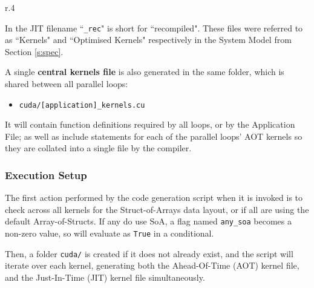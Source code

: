 \begin{wrapfigure}[5]{r}{.4\textwidth}
  \vspace{-1cm}
\end{wrapfigure}
\noindent In the JIT filename ``\verb|_rec|" is short for ``recompiled". These files were referred to as ``Kernels" and ``Optimised Kernels" respectively in the System Model from Section \ref{s:spec}.

\clearpage
A single \textbf{central kernels file} is also generated in the same folder, which is shared between all parallel loops:
\begin{itemize}
\vspace{-.5em}
\item{\verb|cuda/[application]_kernels.cu|}
\end{itemize}
It will contain function definitions required by all loops, or by the Application File; as well as include statements for each of the parallel loops' AOT kernels so they are collated into a single file by the compiler.

\subsubsection{Execution Setup}
The first action performed by the code generation script when it is invoked is to check across all kernels for the Struct-of-Arrays data layout, or if all are using the default Array-of-Structs. If any do use SoA, a flag named \verb|any_soa| becomes a non-zero value, so will evaluate as \verb|True| in a conditional.
\par Then, a folder \verb|cuda/| is created if it does not already exist, and the script will iterate over each kernel, generating both the Ahead-Of-Time (AOT) kernel file, and the Just-In-Time (JIT) kernel file simultaneously.

